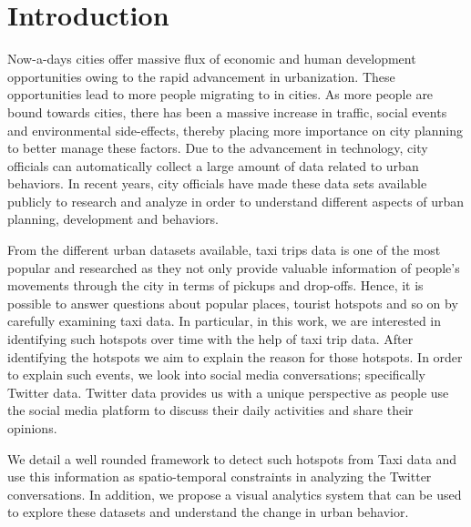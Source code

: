\section{Introduction}
Now-a-days cities offer massive flux of economic and human development opportunities owing to the rapid advancement in urbanization. These opportunities lead to more people migrating to in cities. As more people are bound towards cities, there has been a massive increase in traffic, social events and environmental side-effects, thereby placing more importance on city planning to better manage these factors. Due to the advancement in technology, city officials can automatically collect a large amount of data related to urban behaviors. In recent years, city officials have made these data sets available publicly to research and analyze in order to understand different aspects of urban planning, development and behaviors.

From the different urban datasets available, taxi trips data is one of the most popular and researched as they not only provide valuable information of people's movements through the city in terms of pickups and drop-offs. Hence, it is possible to answer questions about popular places, tourist hotspots and so on by carefully examining taxi data. In particular, in this work, we are interested in identifying such hotspots over time with the help of taxi trip data. After identifying the hotspots we aim to explain the reason for those hotspots. In order to explain such events, we look into social media conversations; specifically Twitter data. Twitter data provides us with a unique perspective as people use the social media platform to discuss their daily activities and share their opinions.

We detail a well rounded framework to detect such hotspots from Taxi data and use this information as spatio-temporal constraints in analyzing the Twitter conversations. In addition, we propose a visual analytics system that can be used to explore these datasets and understand the change in urban behavior.
 

